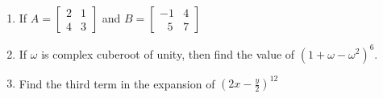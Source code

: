\documentclass[16pt,a4paper]{article}
\begin{document}
\begin {enumerate}
\item If \( A = \left[ 
\begin{array}{cc} 
2&1 \\ 4&3
\end{array} 
\right] \) and \( B = \left[ 
\begin{array}{cc} 
-1&4 \\ \ \ \ 5&7
\end{array} 
\right] \)

\item If $\omega$ is complex cuberoot of unity, then find the value of $(1 + \omega - \omega ^2)^6 $.

\item Find the third term in the expansion of $\left(2x - \frac {y}{2} \right)^{12}$

\end{enumerate}
\end{document}
